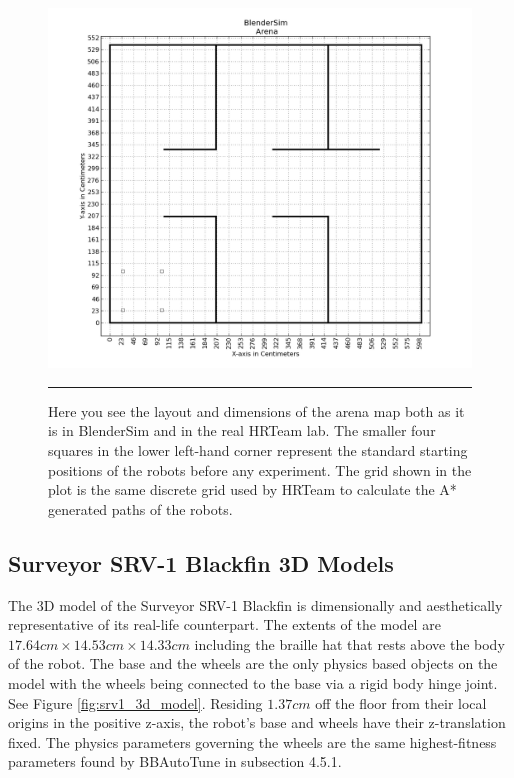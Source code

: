 \begin{figure}[htbp]
\centering
\includegraphics[width=6in]{../Figures/Chapter5/arena.png}
\rule{35em}{0.5pt}
\caption[BlenderSim Arena]{Here you see the layout and dimensions of the arena map both as it is in BlenderSim and in the real HRTeam lab. The smaller four squares in the lower left-hand corner represent the standard starting positions of the robots before any experiment. The grid shown in the plot is the same discrete grid used by HRTeam to calculate the A* generated paths of the robots. }
\label{fig:arena_map}
\end{figure}

\subsection{Surveyor SRV-1 Blackfin 3D Models}

The 3D model of the Surveyor SRV-1 Blackfin is dimensionally and aesthetically representative of its real-life counterpart. The extents of the model are $17.64cm\times14.53cm\times14.33cm$ including the braille hat that rests above the body of the robot. The base and the wheels are the only physics based objects on the model with the wheels being connected to the base via a rigid body hinge joint. See Figure \ref{fig:srv1_3d_model}. Residing $1.37cm$ off the floor from their local origins in the positive z-axis, the robot's base and wheels have their z-translation fixed. The physics parameters governing the wheels are the same highest-fitness parameters found by BBAutoTune in subsection 4.5.1.   

